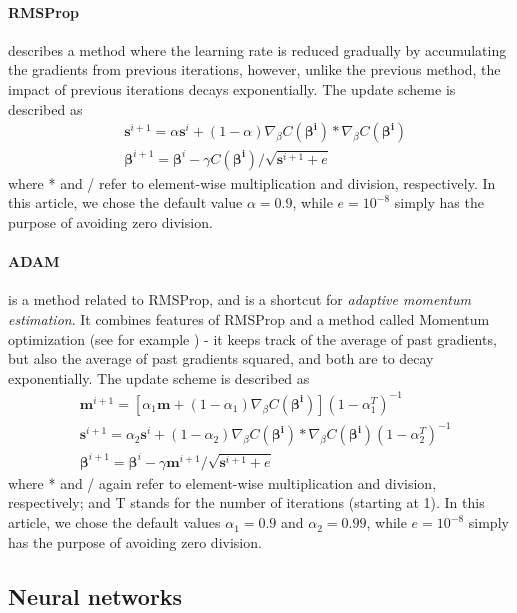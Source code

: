 \documentclass[11pt,a4paper,titlepage]{article}
\begin{document}
\paragraph*{RMSProp} describes a method where the learning rate is reduced gradually by accumulating the gradients from previous iterations, however, unlike the previous method, the impact of previous iterations decays exponentially. The update scheme is described as 
\begin{equation}
\begin{split}
    &\bm{s}^{i+1}=\alpha \bm{s}^{i}+(1-\alpha) \nabla_\beta C(\bm{\beta^{i}})* \nabla_\beta C(\bm{\beta^{i}}) \\
   &\bm{\beta}^{i+1}=\bm{\beta}^{i}-\gamma C(\bm{\beta^{i}}) / \sqrt{\bm{s}^{i+1}+e}
\end{split}
\end{equation}
where * and / refer to element-wise multiplication and division, respectively. In this article, we chose the default value $\alpha=0.9$, while $e=10^{-8}$ simply has the purpose of avoiding zero division.
\paragraph*{ADAM} is a method related to RMSProp, and is a shortcut for \textit{adaptive momentum estimation}. It combines features of RMSProp and a method called Momentum optimization (see for example \citep{MortenLectureNotes}) - it keeps track of the average of past gradients, but also the average of past gradients squared, and both are to decay exponentially. The update scheme is described as 
\begin{equation}
\begin{split}
    & \bm{m}^{i+1}=[\alpha_1\bm{m}+(1-\alpha_1) \nabla_\beta C(\bm{\beta^{i}})](1-\alpha_1^T)^{-1}\\
    &\bm{s}^{i+1}=\alpha_2 \bm{s}^{i}+(1-\alpha_2) \nabla_\beta C(\bm{\beta^{i}})* \nabla_\beta C(\bm{\beta^{i}})(1-\alpha_2^T)^{-1} \\
   &\bm{\beta}^{i+1}=\bm{\beta}^{i}-\gamma\bm{m}^{i+1} / \sqrt{\bm{s}^{i+1}+e}
\end{split}
\end{equation}
where * and /  again refer to element-wise multiplication and division, respectively; and T stands for the number of iterations (starting at 1). In this article, we chose the default values $\alpha_1=0.9$ and $\alpha_2=0.99$, while $e=10^{-8}$ simply has the purpose of avoiding zero division.
\subsection{Neural networks}
\end{document}
